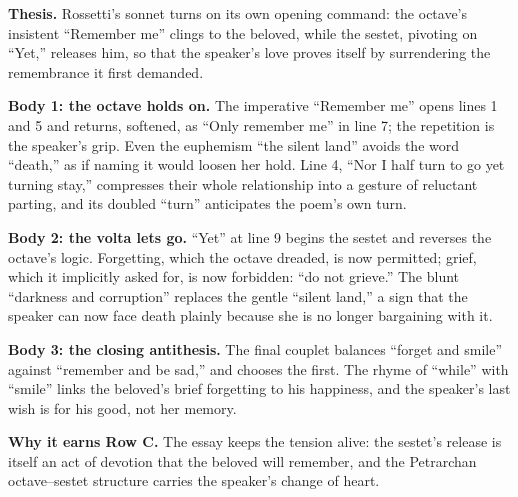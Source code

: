 \documentclass[11pt]{article}
\begin{document}
\begin{modelessay}
\textbf{Thesis.} Rossetti's sonnet turns on its own opening command: the octave's insistent ``Remember me'' clings to the beloved, while the sestet, pivoting on ``Yet,'' releases him, so that the speaker's love proves itself by surrendering the remembrance it first demanded.

\textbf{Body 1: the octave holds on.} The imperative ``Remember me'' opens lines 1 and 5 and returns, softened, as ``Only remember me'' in line 7; the repetition is the speaker's grip. Even the euphemism ``the silent land'' avoids the word ``death,'' as if naming it would loosen her hold. Line 4, ``Nor I half turn to go yet turning stay,'' compresses their whole relationship into a gesture of reluctant parting, and its doubled ``turn'' anticipates the poem's own turn.

\textbf{Body 2: the volta lets go.} ``Yet'' at line 9 begins the sestet and reverses the octave's logic. Forgetting, which the octave dreaded, is now permitted; grief, which it implicitly asked for, is now forbidden: ``do not grieve.'' The blunt ``darkness and corruption'' replaces the gentle ``silent land,'' a sign that the speaker can now face death plainly because she is no longer bargaining with it.

\textbf{Body 3: the closing antithesis.} The final couplet balances ``forget and smile'' against ``remember and be sad,'' and chooses the first. The rhyme of ``while'' with ``smile'' links the beloved's brief forgetting to his happiness, and the speaker's last wish is for his good, not her memory.

\textbf{Why it earns Row C.} The essay keeps the tension alive: the sestet's release is itself an act of devotion that the beloved will remember, and the Petrarchan octave--sestet structure carries the speaker's change of heart.
\end{modelessay}
\end{document}
